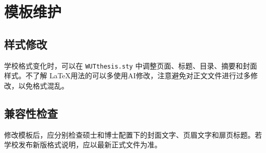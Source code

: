 \chapter{模板维护}

\section{样式修改}
学校格式变化时，可以在 \texttt{WUTthesis.sty} 中调整页面、标题、目录、摘要和封面样式。不了解 \LaTeX 用法的可以多使用AI修改，注意避免对正文文件进行过多修改，以免格式混乱。

\section{兼容性检查}
修改模板后，应分别检查硕士和博士配置下的封面文字、页眉文字和扉页标题。若学校发布新版格式说明，应以最新正式文件为准。
